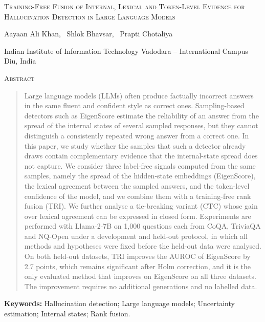 \documentclass[10pt]{article}
\begin{document}
\begin{center}
{\LARGE\scshape Training-Free Fusion of Internal, Lexical and Token-Level Evidence for Hallucination Detection in Large Language Models\par}
\vspace{14pt}
{\normalsize Aayaan Ali Khan, \ Shlok Bhavsar, \ Prapti Chotaliya\par}
\vspace{2pt}
{\small Indian Institute of Information Technology Vadodara -- International Campus Diu, India\par}
\end{center}
\vspace{6pt}

\begin{center}{\large\scshape Abstract}\end{center}
\vspace{-4pt}
\begin{quote}
Large language models (LLMs) often produce factually incorrect answers in the same fluent and confident style as correct ones. Sampling-based detectors such as EigenScore estimate the reliability of an answer from the spread of the internal states of several sampled responses, but they cannot distinguish a consistently repeated wrong answer from a correct one. In this paper, we study whether the samples that such a detector already draws contain complementary evidence that the internal-state spread does not capture. We consider three label-free signals computed from the same samples, namely the spread of the hidden-state embeddings (EigenScore), the lexical agreement between the sampled answers, and the token-level confidence of the model, and we combine them with a training-free rank fusion (TRI). We further analyse a tie-breaking variant (CTC) whose gain over lexical agreement can be expressed in closed form. Experiments are performed with Llama-2-7B on 1,000 questions each from CoQA, TriviaQA and NQ-Open under a development and held-out protocol, in which all methods and hypotheses were fixed before the held-out data were analysed. On both held-out datasets, TRI improves the AUROC of EigenScore by 2.7 points, which remains significant after Holm correction, and it is the only evaluated method that improves on EigenScore on all three datasets. The improvement requires no additional generations and no labelled data.
\end{quote}

\textbf{Keywords:} Hallucination detection; Large language models; Uncertainty estimation; Internal states; Rank fusion.
\end{document}
